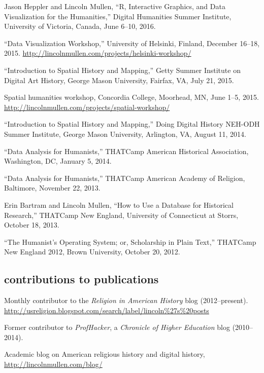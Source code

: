 \documentclass[11pt]{article}
\begin{document}
Jason Heppler and Lincoln Mullen, ``R, Interactive Graphics, and Data 
Visualization for the Humanities,'' Digital Humanities Summer Institute, 
University of Victoria, Canada, June 6--10, 2016.  

``Data Visualization Workshop,'' University of Helsinki, Finland, December 
16--18, 2015. \url{http://lincolnmullen.com/projects/helsinki-workshop/}

``Introduction to Spatial History and Mapping,'' Getty Summer Institute on 
Digital Art History, George Mason University, Fairfax, VA, July 21, 2015.

Spatial humanities workshop, Concordia College, Moorhead, MN, June 1--5, 2015.  
\url{http://lincolnmullen.com/projects/spatial-workshop/}

``Introduction to Spatial History and Mapping,'' Doing Digital History NEH-ODH 
Summer Institute, George Mason University, Arlington, VA, August 11, 2014.

``Data Analysis for Humanists,'' THATCamp American Historical Association, 
Washington, DC, January 5, 2014.

``Data Analysis for Humanists,'' THATCamp American Academy of Religion, 
Baltimore, November 22, 2013.

Erin Bartram and Lincoln Mullen, ``How to Use a Database for Historical 
Research,'' THATCamp New England, University of Connecticut at Storrs, October 
18, 2013.

``The Humanist's Operating System; or, Scholarship in Plain Text,'' THATCamp 
New England 2012, Brown University, October 20, 2012.

\subsection{contributions to
  publications}\label{contributions-to-publications}

Monthly contributor to the \emph{Religion in American History} blog (2012--present). \url{http://usreligion.blogspot.com/search/label/lincoln\%27s\%20posts}

Former contributor to \emph{ProfHacker}, a \emph{Chronicle of Higher 
  Education} blog (2010--2014). 

Academic blog on American religious history and digital history, 
\url{http://lincolnmullen.com/blog/}

% 
\end{document}
